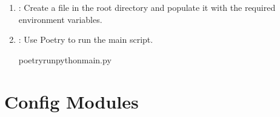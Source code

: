 \documentclass[letterpaper,10pt,english]{sphinxmanual}
\begin{document}
\begin{enumerate}
\item {} 
\sphinxAtStartPar
{}: Create a  file in the root directory and populate it with the required environment variables.

\item {} 
\sphinxAtStartPar
{}: Use Poetry to run the main script.

\begin{sphinxVerbatim}[commandchars=\\\{\}]
poetryrunpythonmain.py
\end{sphinxVerbatim}

\end{enumerate}

\sphinxstepscope


\chapter{Config Modules}
\label{\detokenize{config:config-modules}}\label{\detokenize{config::doc}}
\end{document}
